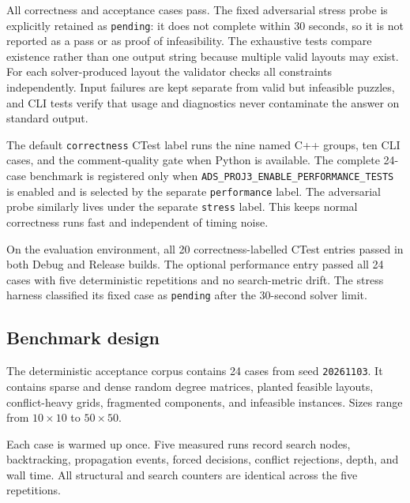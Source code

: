 \documentclass[11pt,a4paper,oneside]{article}
\begin{document}
All correctness and acceptance cases pass. The fixed adversarial stress probe is
explicitly retained as \texttt{pending}: it does not complete within 30 seconds,
so it is not reported as a pass or as proof of infeasibility. The exhaustive
tests compare existence rather than one output string because multiple valid
layouts may exist. For each solver-produced layout the validator checks all
constraints independently. Input failures are kept separate from valid but
infeasible puzzles, and CLI tests verify that usage and diagnostics never
contaminate the answer on standard output.

The default \texttt{correctness} CTest label runs the nine named C++ groups, ten
CLI cases, and the comment-quality gate when Python is available. The complete
24-case benchmark is registered only when
\texttt{ADS\_PROJ3\_ENABLE\_PERFORMANCE\_TESTS} is enabled and is selected by the
separate \texttt{performance} label. The adversarial probe similarly lives under
the separate \texttt{stress} label. This keeps normal correctness runs fast and
independent of timing noise.

On the evaluation environment, all 20 correctness-labelled CTest entries passed
in both Debug and Release builds. The optional performance entry passed all 24
cases with five deterministic repetitions and no search-metric drift. The stress
harness classified its fixed case as \texttt{pending} after the 30-second solver
limit.

\subsection{Benchmark design}

The deterministic acceptance corpus contains 24 cases from seed \texttt{20261103}. It
contains sparse and dense random degree matrices, planted feasible layouts,
conflict-heavy grids, fragmented components, and infeasible instances. Sizes
range from $10\times10$ to $50\times50$.

Each case is warmed up once. Five measured runs record search nodes, backtracking,
propagation events, forced decisions, conflict rejections, depth, and wall time.
All structural and search counters are identical across the five repetitions.
\end{document}
